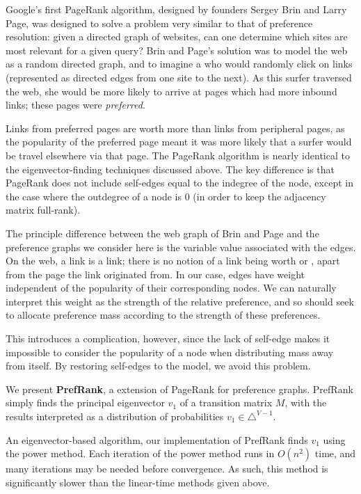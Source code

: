 Google's first PageRank algorithm, designed by founders Sergey Brin and Larry Page, was designed to solve a problem very similar to that of preference resolution: given a directed graph of websites, can one determine which sites are most relevant for a given query?
Brin and Page's solution was to model the web as a random directed graph, and to imagine a  who would randomly click on links (represented as directed edges from one site to the next).
As this surfer traversed the web, she would be more likely to arrive at pages which had more inbound links; these pages were \textit{preferred}.

Links from preferred pages are worth more than links from peripheral pages, as the popularity of the preferred page meant it was more likely that a surfer would be travel elsewhere via that page.
The PageRank algorithm is nearly identical to the eigenvector-finding techniques discussed above.
The key difference is that PageRank does not include self-edges equal to the indegree of the node, except in the case where the outdegree of a node is $0$ (in order to keep the adjacency matrix full-rank).

\bigskip

The principle difference between the web graph of Brin and Page and the preference graphs we consider here is the variable value associated with the edges.
On the web, a link is a link; there is no notion of a link being worth  or , apart from the page the link originated from.
In our case, edges have weight independent of the popularity of their corresponding nodes.
We can naturally interpret this weight as the strength of the relative preference, and so should seek to allocate preference mass according to the strength of these preferences.

This introduces a complication, however, since the lack of self-edge makes it impossible to consider the popularity of a node when distributing mass away from itself.
By restoring self-edges to the model, we avoid this problem.

\bigskip

We present \textbf{PrefRank}, a extension of PageRank for preference graphs.
PrefRank simply finds the principal eigenvector $v_1$ of a transition matrix $M$, with the results interpreted as a distribution of probabilities $v_1 \in \triangle^{V-1}$.

An eigenvector-based algorithm, our implementation of PrefRank finds $v_1$ using the power method. Each iteration of the power method runs in $O(n^2)$ time, and many iterations may be needed before convergence.
As such, this method is significantly slower than the linear-time methods given above.

